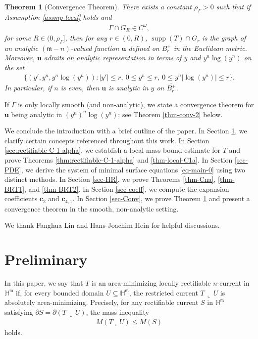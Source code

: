 \documentclass[11pt,reqno]{amsart}
\newcommand{\fm}{\mathfrak{m}}
\renewcommand{\leq}{\leqslant}
\newtheorem{theorem}{Theorem}[section]
\theoremstyle{definition}
\numberwithin{equation}{section}
\begin{document}
\begin{theorem}[Convergence Theorem]\label{thm-Conv-1}
There exists a constant $\rho_\Gamma>0$ such that if Assumption \ref{assmp-local} holds and
\begin{align}
\Gamma \cap \overline{G_R} \in C^\omega,
\end{align}
for some $R\in (0, \rho_\Gamma]$, then for any $r\in (0, R)$, $\operatorname{supp}(T) \cap G_r$ is the graph of an analytic $(\fm-n)$-valued function $\mathbf{u}$ defined on $B^+_r$ in the Euclidean metric. Moreover, $\mathbf{u}$ admits an analytic representation in terms of $y$ and $y^n\log(y^n)$ on the set
\begin{align}
    \bigl\{(y', y^n, y^n\log(y^n)): |y'|\leq r,\ 0\leq y^n \leq r,\ 0\leq y^n|\log(y^n)|\leq r\bigr\}.
\end{align}
In particular, if $n$ is even, then $\mathbf{u}$ is analytic in $y$ on $\overline{B^+_r}$.
\end{theorem}

If $\Gamma$ is only locally smooth (and non-analytic), we state a convergence theorem for $\mathbf{u}$ being analytic in $(y^n)^n\log(y^n)$; see Theorem \ref{thm-conv-2} below.

We conclude the introduction with a brief outline of the paper. In Section \ref{sec-pre}, we clarify certain concepts referenced throughout this work. In Section \ref{sec:rectifiable-C-1-alpha}, we establish a local mass bound estimate for $T$ and prove Theorems \ref{thm:rectifiable-C-1-alpha} and \ref{thm-local-C1a}. In Section \ref{sec-PDE}, we derive the system of minimal surface equations \eqref{eq-main-0} using two distinct methods. In Section \ref{sec-HR}, we prove Theorems \ref{thm-Cna}, \ref{thm-BRT1}, and \ref{thm-BRT2}. In Section \ref{sec-coeff}, we compute the expansion coefficients $\mathbf c_2$ and $\mathbf c_{4,1}$. In Section \ref{sec-Conv}, we prove Theorem \ref{thm-Conv-1} and present a convergence theorem in the smooth, non-analytic setting.

We thank Fanghua Lin and Hans-Joachim Hein for helpful discussions.

\section{Preliminary}\label{sec-pre}
In this paper, we say that $T$ is an area-minimizing locally rectifiable $n$-current in $\mathbb{H}^\fm$ if, for every bounded domain $U \subseteq \mathbb{H}^\fm$, the restricted current $T\, \mathbin{\llcorner}\, U$ is absolutely area-minimizing. Precisely, for any rectifiable current $S$ in $\mathbb{H}^\fm$ satisfying $\partial S = \partial (T\, \mathbin{\llcorner}\, U)$, the mass inequality
\begin{align}
    M(T \mathbin{\llcorner} U) \leq M(S)
\end{align}
holds.
\end{document}
